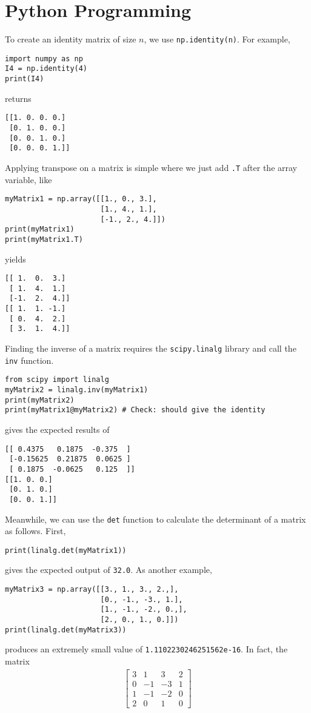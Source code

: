 \section{Python Programming}
\label{section:ch2python}
To create an identity matrix of size $n$, we use \verb|np.identity(n)|. For example,
\begin{lstlisting}
import numpy as np
I4 = np.identity(4)
print(I4)
\end{lstlisting}
returns
\begin{lstlisting}
[[1. 0. 0. 0.]
 [0. 1. 0. 0.]
 [0. 0. 1. 0.]
 [0. 0. 0. 1.]]
\end{lstlisting}
Applying transpose on a matrix is simple where we just add \verb|.T| after the array variable, like
\begin{lstlisting}
myMatrix1 = np.array([[1., 0., 3.],
                      [1., 4., 1.],
                      [-1., 2., 4.]])
print(myMatrix1)
print(myMatrix1.T)
\end{lstlisting}
yields
\begin{lstlisting}
[[ 1.  0.  3.]
 [ 1.  4.  1.]
 [-1.  2.  4.]]
[[ 1.  1. -1.]
 [ 0.  4.  2.]
 [ 3.  1.  4.]]
\end{lstlisting}
Finding the inverse of a matrix requires the \verb|scipy.linalg| library and call the \verb|inv| function.
\begin{lstlisting}
from scipy import linalg
myMatrix2 = linalg.inv(myMatrix1)
print(myMatrix2)
print(myMatrix1@myMatrix2) # Check: should give the identity
\end{lstlisting}
gives the expected results of
\begin{lstlisting}
[[ 0.4375   0.1875  -0.375  ]
 [-0.15625  0.21875  0.0625 ]
 [ 0.1875  -0.0625   0.125  ]]
[[1. 0. 0.]
 [0. 1. 0.]
 [0. 0. 1.]]
\end{lstlisting}
Meanwhile, we can use the \verb|det| function to calculate the determinant of a matrix as follows. First,
\begin{lstlisting}
print(linalg.det(myMatrix1))
\end{lstlisting}
gives the expected output of \verb|32.0|. As another example,
\begin{lstlisting}
myMatrix3 = np.array([[3., 1., 3., 2.,],
                      [0., -1., -3., 1.],
                      [1., -1., -2., 0.,],
                      [2., 0., 1., 0.]])
print(linalg.det(myMatrix3))  
\end{lstlisting}
produces an extremely small value of \verb|1.1102230246251562e-16|. In fact, the matrix
\begin{align*}
\begin{bmatrix}
3 & 1 & 3 & 2 \\
0 & -1 & -3 & 1 \\
1 & -1 & -2 & 0 \\
2 & 0 & 1 & 0    
\end{bmatrix}
\end{align*}
